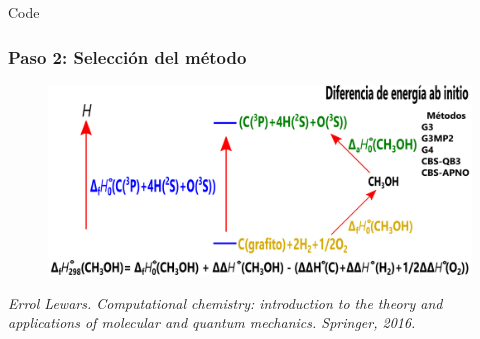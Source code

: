 \documentclass{beamer}
\begin{document}
\begin{frame}[fragile]{Code}
\frametitle{Paso 2: Selección del método}
\begin{figure}
\includegraphics[scale=.5]{images/atomization-CH3OH-methods}
\end{figure}
\tiny{\textit{Errol Lewars. Computational chemistry: introduction to the theory and applications of molecular and quantum mechanics. Springer, 2016.}}

\end{frame}

\end{document}
